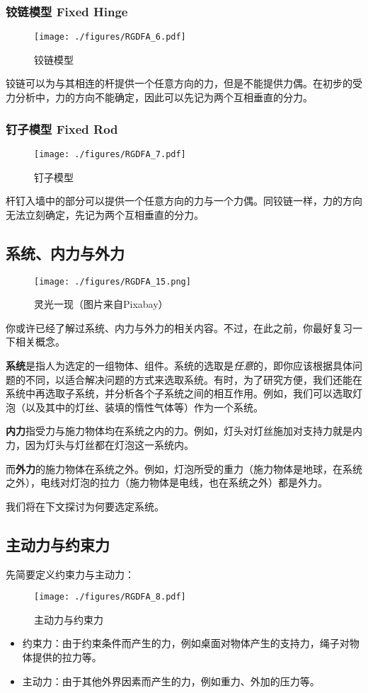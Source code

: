\subsubsection{铰链模型 Fixed Hinge}
\begin{figure}[ht]
\centering
\texttt{[image: ./figures/RGDFA\_6.pdf]}
\caption{铰链模型} \label{RGDFA_fig6}
\end{figure}
铰链可以为与其相连的杆提供一个任意方向的力，但是不能提供力偶。在初步的受力分析中，力的方向不能确定，因此可以先记为两个互相垂直的分力。
\subsubsection{钉子模型 Fixed Rod}
\begin{figure}[ht]
\centering
\texttt{[image: ./figures/RGDFA\_7.pdf]}
\caption{钉子模型} \label{RGDFA_fig7}
\end{figure}
杆钉入墙中的部分可以提供一个任意方向的力与一个力偶。同铰链一样，力的方向无法立刻确定，先记为两个互相垂直的分力。

\subsection{系统、内力与外力}
\begin{figure}[ht]
\centering
\texttt{[image: ./figures/RGDFA\_15.png]}
\caption{灵光一现（图片来自Pixabay）} \label{RGDFA_fig15}
\end{figure}

你或许已经了解过系统、内力与外力的相关内容。不过，在此之前，你最好复习一下相关概念。

\textbf{系统}是指人为选定的一组物体、组件。系统的选取是\textsl{任意}的，即你应该根据具体问题的不同，以适合解决问题的方式来选取系统。有时，为了研究方便，我们还能在系统中再选取子系统，并分析各个子系统之间的相互作用。例如，我们可以选取灯泡（以及其中的灯丝、装填的惰性气体等）作为一个系统。

\textbf{内力}指受力与施力物体均在系统之内的力。例如，灯头对灯丝施加对支持力就是内力，因为灯头与灯丝都在灯泡这一系统内。

而\textbf{外力}的施力物体在系统之外。例如，灯泡所受的重力（施力物体是地球，在系统之外），电线对灯泡的拉力（施力物体是电线，也在系统之外）都是外力。

我们将在下文探讨为何要选定系统。

\subsection{主动力与约束力}
先简要定义约束力与主动力：
\begin{figure}[ht]
\centering
\texttt{[image: ./figures/RGDFA\_8.pdf]}
\caption{主动力与约束力} \label{RGDFA_fig8}
\end{figure}
\begin{itemize}
\item 约束力：由于约束条件而产生的力，例如桌面对物体产生的支持力，绳子对物体提供的拉力等。
\item 主动力：由于其他外界因素而产生的力，例如重力、外加的压力等。
\end{itemize}

